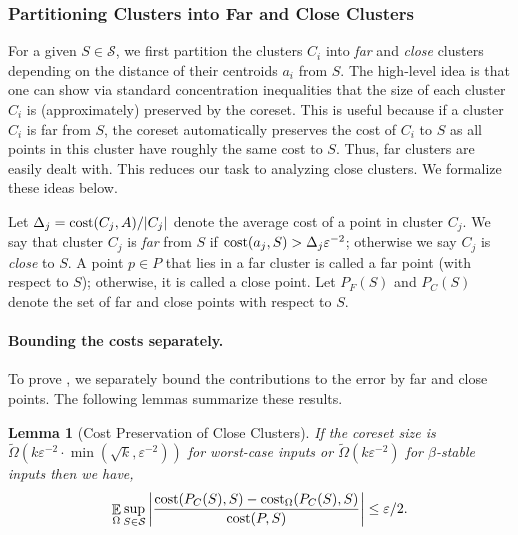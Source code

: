 \documentclass[11pt]{article}
\newtheorem{lemma}{Lemma}[section]
\theoremstyle{restate}
\theoremstyle{definition}
\newcommand{\eps}{\ensuremath{\varepsilon}}
\newcommand{\E}{\mathop{\mathbb{E}}}
\newcommand{\cost}{\textnormal{cost}}
\newcommand{\costom}{\cost_\Omega} %
\newcommand{\notfar}[1]{{P_C}(#1)}
\begin{document}
\subsubsection{Partitioning Clusters into  Far and Close Clusters}\label{sec: far-close-points}
For a given $S \in \mathcal{S}$, we first partition the clusters $C_i$ into \textit{far} and \textit{close} clusters depending on the distance of their centroids $a_i$ from $S$. The high-level idea is that one can show via standard concentration inequalities that the size of each cluster $C_i$ is (approximately) preserved by the coreset. This is useful because if a cluster $C_i$ is far from $S$, the coreset automatically preserves the cost of $C_i$ to $S$ as all points in this cluster have roughly the same cost to $S$. Thus, far clusters are easily dealt with. This reduces our task to analyzing close clusters. We formalize these ideas below.

Let $\Delta_j = \cost(C_j, A)/|C_j|$ denote the average cost of a point in cluster $C_j$. We say that cluster $C_j$ is \textit{far} from $S$ if $\cost(a_j, S) > \Delta_j \eps^{-2}$; otherwise we say $C_j$ is \textit{close} to $S$. A point $p \in P$ that lies in a far cluster is called a far point (with respect to $S$); otherwise, it is called a close point. Let $P_F(S)$ and $\notfar{S}$ denote the set of far and close points with respect to $S$. 

\paragraph{Bounding the costs separately.} To prove 
, we separately bound the contributions to the error by far and close points. The following lemmas summarize these results.


\begin{lemma}[Cost Preservation of Close Clusters]\label{lem: goal-close}
	If the coreset size is ${\tilde{\Omega}(k \eps^{-2} \cdot \min (\sqrt{k}, \eps^{-2}))}$ for worst-case inputs or $ \tilde{\Omega}(k \eps^{-2})$ for $\beta$-stable inputs then we have,
	\begin{align*}
		\begin{split}
			\E_{ \Omega} \sup_{S \in \mathcal{S}} \left\lvert \frac{\cost(\notfar{S},S) - \costom(\notfar{S},S)}{\cost(P,S)} \right\rvert \leq \eps/2.
		\end{split}
	\end{align*}
\end{lemma}
\end{document}
